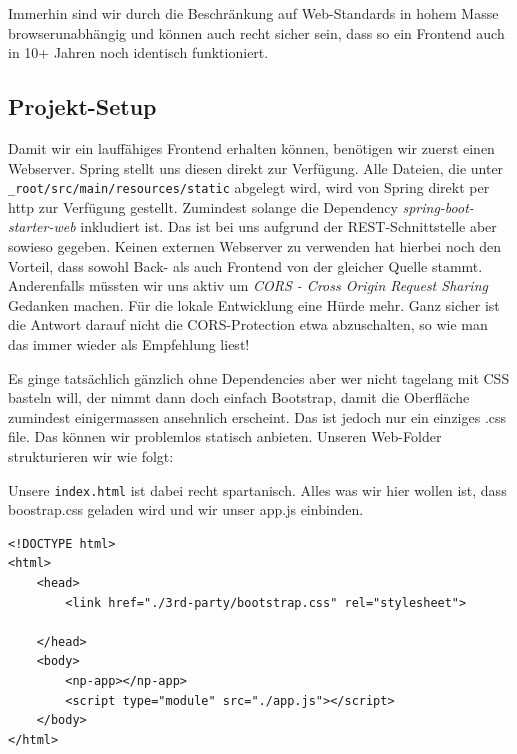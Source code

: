 Immerhin sind wir durch die Beschränkung auf Web-Standards in hohem Masse
browserunabhängig und können auch recht sicher sein, dass so ein Frontend
auch in 10+ Jahren noch identisch funktioniert.

\subsection{Projekt-Setup}
Damit wir ein lauffähiges Frontend erhalten können, benötigen wir zuerst
einen Webserver. Spring stellt uns diesen direkt zur Verfügung.
Alle Dateien, die unter \texttt{\_root/src/main/resources/static}
abgelegt wird, wird von Spring direkt per http zur Verfügung gestellt.
Zumindest solange die Dependency \textit{spring-boot-starter-web}
inkludiert ist. Das ist bei uns aufgrund der REST-Schnittstelle aber
sowieso gegeben. Keinen externen Webserver zu verwenden hat hierbei
noch den Vorteil, dass sowohl Back- als auch Frontend von der gleicher
Quelle stammt. Anderenfalls müssten wir uns aktiv um \textit{CORS
- Cross Origin Request Sharing} Gedanken machen. Für die lokale
Entwicklung eine Hürde mehr. Ganz sicher ist die Antwort darauf nicht
die CORS-Protection etwa abzuschalten, so wie man das immer wieder
als Empfehlung liest!

Es ginge tatsächlich gänzlich ohne Dependencies aber wer nicht tagelang
mit CSS basteln will, der nimmt dann doch einfach Bootstrap, damit die
Oberfläche zumindest einigermassen ansehnlich erscheint. Das ist jedoch
nur ein einziges .css file. Das können wir problemlos statisch anbieten.
Unseren Web-Folder strukturieren wir wie folgt:

%

Unsere \texttt{index.html} ist dabei recht spartanisch. Alles was wir hier
wollen ist, dass boostrap.css geladen wird und wir unser app.js einbinden.


\begin{listing}[H]
\begin{verbatim}
<!DOCTYPE html>
<html>
    <head>
        <link href="./3rd-party/bootstrap.css" rel="stylesheet">

    </head>
    <body>
        <np-app></np-app>
        <script type="module" src="./app.js"></script>
    </body>
</html>
\end{verbatim}
\caption{index.html}
\label{lst:indexhtml}
\end{listing}

